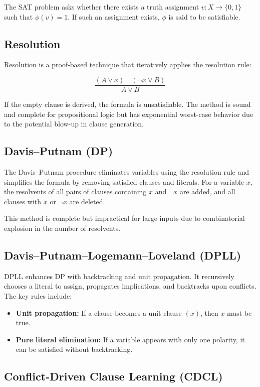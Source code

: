 \documentclass[11pt]{article}
\begin{document}
The SAT problem asks whether there exists a truth assignment $v: X \rightarrow \{0,1\}$ such that $\phi(v) = 1$. If such an assignment exists, $\phi$ is said to be satisfiable.

\subsection*{Resolution}

Resolution is a proof-based technique that iteratively applies the resolution rule:

\[
\frac{(A \lor x) \quad (\neg x \lor B)}{A \lor B}
\]

If the empty clause is derived, the formula is unsatisfiable. The method is sound and complete for propositional logic but has exponential worst-case behavior due to the potential blow-up in clause generation.

\subsection*{Davis–Putnam (DP)}

The Davis–Putnam procedure eliminates variables using the resolution rule and simplifies the formula by removing satisfied clauses and literals. For a variable $x$, the resolvents of all pairs of clauses containing $x$ and $\neg x$ are added, and all clauses with $x$ or $\neg x$ are deleted.

This method is complete but impractical for large inputs due to combinatorial explosion in the number of resolvents.

\subsection*{Davis–Putnam–Logemann–Loveland (DPLL)}

DPLL enhances DP with backtracking and unit propagation. It recursively chooses a literal to assign, propagates implications, and backtracks upon conflicts. The key rules include:

\begin{itemize}
    \item \textbf{Unit propagation:} If a clause becomes a unit clause $(x)$, then $x$ must be true.
    \item \textbf{Pure literal elimination:} If a variable appears with only one polarity, it can be satisfied without backtracking.
\end{itemize}

\subsection*{Conflict-Driven Clause Learning (CDCL)}
\end{document}
